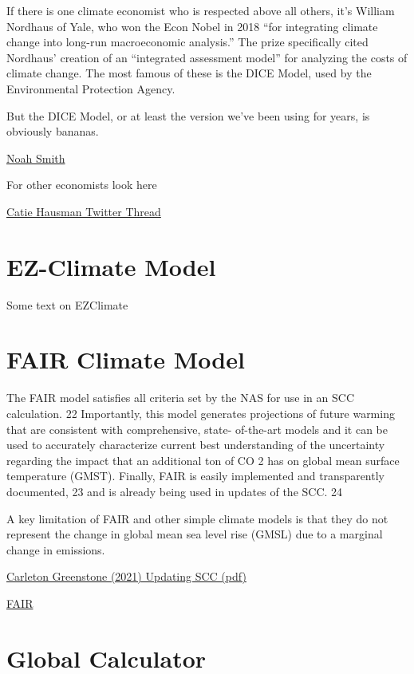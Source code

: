 \documentclass[
]{book}
\begin{document}
If there is one climate economist who is respected above all others, it's William Nordhaus of Yale, who won the Econ Nobel in 2018 ``for integrating climate change into long-run macroeconomic analysis.'' The prize specifically cited Nordhaus' creation of an ``integrated assessment model'' for analyzing the costs of climate change. The most famous of these is the DICE Model, used by the Environmental Protection Agency.

But the DICE Model, or at least the version we've been using for years, is obviously bananas.

\href{https://noahpinion.substack.com/p/why-has-climate-economics-failed}{Noah Smith}

For other economists look here

\href{https://twitter.com/CatieHausman/status/1381999336423362568}{Catie Hausman Twitter Thread}

\hypertarget{ez-climate-model}{%
\section{EZ-Climate Model}\label{ez-climate-model}}

Some text on EZClimate

\hypertarget{fair-climate-model}{%
\section{FAIR Climate Model}\label{fair-climate-model}}

The FAIR model satisfies all
criteria set by the NAS for use in an SCC calculation. 22 Importantly, this model
generates projections of future warming that are consistent with comprehensive, state-
of-the-art models and it can be used to accurately characterize current best
understanding of the uncertainty regarding the impact that an additional ton of CO 2
has on global mean surface temperature (GMST). Finally, FAIR is easily implemented
and transparently documented, 23 and is already being used in updates of the SCC. 24

A key limitation of FAIR and other simple climate models is that they do not represent
the change in global mean sea level rise (GMSL) due to a marginal change in emissions.

\href{Greenstone_2021_Updating_SCC.pdf}{Carleton Greenstone (2021) Updating SCC (pdf)}

\href{https://fair.readthedocs.io/en/latest/}{FAIR}

\hypertarget{global-calculator}{%
\section{Global Calculator}\label{global-calculator}}
\end{document}
